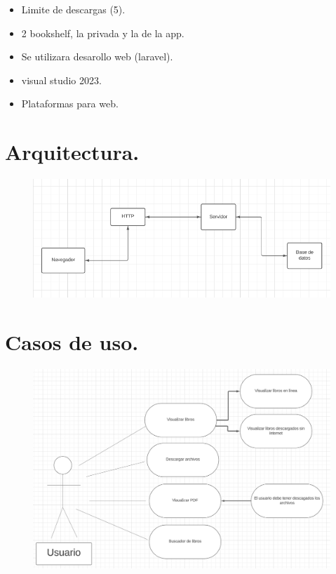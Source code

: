 \documentclass[12pt]{article}
\begin{document}
\begin{itemize}
	\item Limite de descargas (5).
	\item 2 bookshelf, la privada y la de la app.
	\item Se utilizara desarollo web (laravel).
	\item visual studio 2023.
	\item Plataformas para web. 
\end{itemize}

\newpage

\section{Arquitectura.}

\begin{figure}[htbp]
	\centering
		\includegraphics[width=1.00\textwidth]{Screenshot 2023-10-05 125036.png}
	\label{fig:Screenshot 2023-10-05 125036}
\end{figure}

\newpage

\section{Casos de uso.}

\begin{figure}[htbp]
	\centering
		\includegraphics[width=1.00\textwidth]{Captura de pantalla 2023-09-07 124622.png}
	\label{fig:Captura de pantalla 2023-09-07 124622}
\end{figure}
\end{document}
